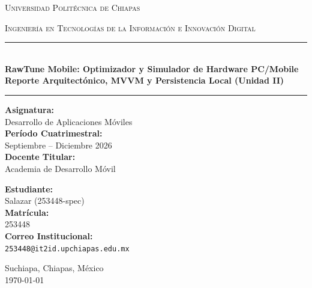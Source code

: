 \documentclass[12pt,a4paper]{article}
\begin{document}
\begin{titlepage}
    \centering
    \vspace*{1cm}
    
    {\scshape\Large Universidad Politécnica de Chiapas \par}
    \vspace{0.3cm}
    {\scshape\large Ingeniería en Tecnologías de la Información e Innovación Digital \par}
    
    \vspace{1.5cm}
    \rule{\linewidth}{1.5pt} \\[0.4cm]
    {\huge \bfseries RawTune Mobile: Optimizador y Simulador de Hardware PC/Mobile \\[0.3cm]}
    {\large \textbf{Reporte Arquitectónico, MVVM y Persistencia Local (Unidad II)}}
    \rule{\linewidth}{1.5pt}
    
    \vspace{1.8cm}
    
    \begin{minipage}[t]{0.45\textwidth}
        \textbf{Asignatura:} \\
        Desarrollo de Aplicaciones Móviles \\[0.3cm]
        \textbf{Período Cuatrimestral:} \\
        Septiembre -- Diciembre 2026 \\[0.3cm]
        \textbf{Docente Titular:} \\
        Academia de Desarrollo Móvil
    \end{minipage}
    \hfill
    \begin{minipage}[t]{0.45\textwidth}
        \begin{flushright}
            \textbf{Estudiante:} \\
            Salazar (253448-spec) \\[0.3cm]
            \textbf{Matrícula:} \\
            253448 \\[0.3cm]
            \textbf{Correo Institucional:} \\
            \texttt{253448@it2id.upchiapas.edu.mx}
        \end{flushright}
    \end{minipage}
    
    \vfill
    {\large Suchiapa, Chiapas, México \\ \today \par}
\end{titlepage}
\end{document}
